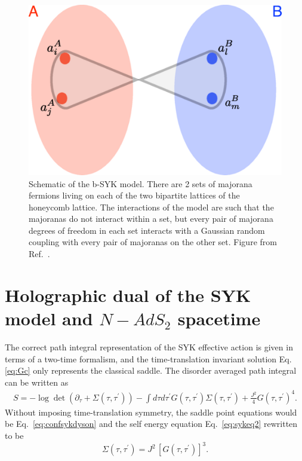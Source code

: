 \begin{figure}
    \centering
    \includegraphics[scale = 0.5]{figures/introduction/bSYK.png}
    \caption{Schematic of the b-SYK model. There are 2 sets of majorana fermions living on each of the two bipartite lattices of the honeycomb lattice. The interactions of the model are such that the majoranas do not interact within a set, but every pair of majorana degrees of freedom in each set interacts with a Gaussian random coupling with every pair of majoranas on the other set. Figure from Ref.~\cite{Fremling_2022}.}
    \label{fig:bsyk}
\end{figure}



\section{Holographic dual of the SYK model and $N-AdS_2$ spacetime}
The correct path integral representation of the SYK effective action is given in terms of a two-time formalism, and the time-translation invariant solution Eq.\eqref{eq:Gc} only represents the classical saddle. The disorder averaged path integral can be written as
\begin{align}
    S = -\log\det\left(\partial_\tau + \Sigma(\tau,\tau^\prime)\right) - \int d\tau d\tau^\prime G(\tau,\tau^\prime)\Sigma(\tau,\tau^\prime) + \frac{J^2}{4} G(\tau,\tau^\prime)^4.
\end{align}
Without imposing time-translation symmetry, the saddle point equations would be Eq.~\eqref{eq:confsykdyson} and the self energy equation Eq.~\eqref{eq:sykeq2} rewritten to be
\begin{equation}
    \Sigma(\tau,\tau^\prime) = J^2\,\left[G(\tau,\tau^\prime)\right]^3. 
    \label{eq:twotimesykeq2}
\end{equation}


